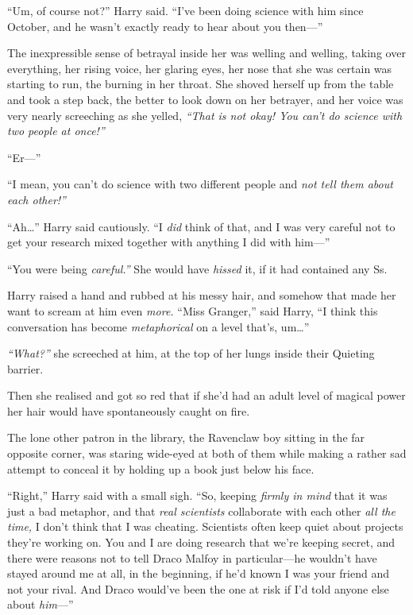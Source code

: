 ``Um, of course not?'' Harry said. ``I've been doing science with him
since October, and he wasn't exactly ready to hear about you then---''

The inexpressible sense of betrayal inside her was welling and welling,
taking over everything, her rising voice, her glaring eyes, her nose
that she was certain was starting to run, the burning in her throat. She
shoved herself up from the table and took a step back, the better to
look down on her betrayer, and her voice was very nearly screeching as
she yelled, \emph{``That is not okay! You can't do science with two
people at once!''}

``Er---''

``I mean, you can't do science with two different people and \emph{not
tell them about each other!''}

``Ah\ldots{}'' Harry said cautiously. ``I \emph{did} think of that, and
I was very careful not to get your research mixed together with anything
I did with him---''

``You were being \emph{careful.''} She would have \emph{hissed} it, if
it had contained any Ss.

Harry raised a hand and rubbed at his messy hair, and somehow that made
her want to scream at him even \emph{more.} ``Miss Granger,'' said
Harry, ``I think this conversation has become \emph{metaphorical} on a
level that's, um\ldots{}''

\emph{``What?''} she screeched at him, at the top of her lungs inside
their Quieting barrier.

Then she realised and got so red that if she'd had an adult level of
magical power her hair would have spontaneously caught on fire.

The lone other patron in the library, the Ravenclaw boy sitting in the
far opposite corner, was staring wide-eyed at both of them while making
a rather sad attempt to conceal it by holding up a book just below his
face.

``Right,'' Harry said with a small sigh. ``So, keeping \emph{firmly in
mind} that it was just a bad metaphor, and that \emph{real scientists}
collaborate with each other \emph{all the time,} I don't think that I
was cheating. Scientists often keep quiet about projects they're working
on. You and I are doing research that we're keeping secret, and there
were reasons not to tell Draco Malfoy in particular---he wouldn't have
stayed around me at all, in the beginning, if he'd known I was your
friend and not your rival. And Draco would've been the one at risk if
I'd told anyone else about \emph{him}---''

